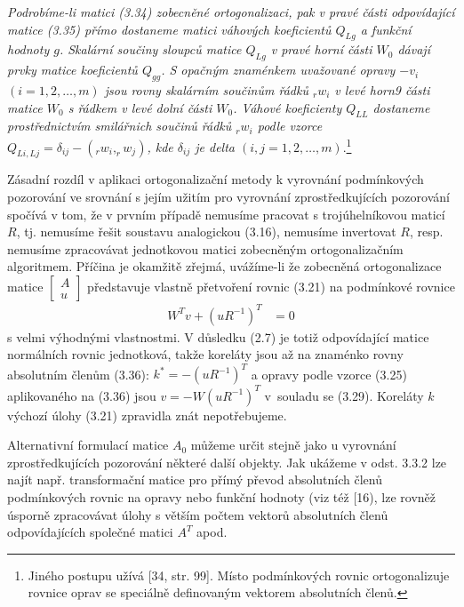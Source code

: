 \emph{Podrobíme-li matici (3.34) zobecněné ortogonalizaci, pak v pravé
části odpovídající matice (3.35) přímo dostaneme matici váhových
koeficientů $Q_{Lg}$ a funkční hodnoty $g$. Skalární součiny sloupců
matice $Q_{Lg}$ v pravé horní části $W_0$ dávají prvky matice
koeficientů $Q_{gg}$. S opačným znaménkem uvažované opravy $-v_i$
$(i=1,2,\ldots,m)$ jsou rovny skalárním součinům řádků $_rw_i$ v levé
horn9 části matice $W_0$ s řádkem v levé dolní části $W_0$. Váhové
koeficienty $Q_{LL}$ dostaneme prostřednictvím smilářnich součinů
řádků $_rw_i$ podle vzorce
%
$Q_{Li,Lj} = \delta_{ij} - (_rw_i,_rw_j)$, kde $\delta_{ij}$
%
je  delta $(i,j=1,2,\ldots,m)$}.\footnote{%
%
Jiného postupu užívá  [34, str. 99]. Místo podmínkových
rovnic ortogonalizuje rovnice oprav se speciálně
definovaným vektorem absolutních členů.}



Zásadní rozdíl v aplikaci ortogonalizační metody k vyrovnání
podmínkových pozorování ve srovnání s jejím užitím pro
vyrovnání zprostředkujících pozorování spočívá v tom, že v
prvním případě nemusíme pracovat s trojúhelníkovou maticí $R$, tj.
nemusíme řešit soustavu analogickou (3.16), nemusíme
invertovat $R$, resp. nemusíme zpracovávat jednotkovou matici
zobecněným ortogonalizačním algoritmem. Příčina je okamžitě zřejmá,
uvážíme-li že zobecněná ortogonalizace matice
%
$\begin{bmatrix}
  A\\u
\end{bmatrix}$
%
představuje vlastně přetvoření rovnic (3.21) na podmínkové rovnice
%
\begin{align*}
\tag{3.36}   W^Tv + (uR^{-1})^T &= 0
\end{align*}
%
s velmi výhodnými vlastnostmi. V důsledku (2.7) je totiž
odpovídající matice normálních rovnic jednotková, takže koreláty
jsou až na znaménko rovny absolutním členům (3.36):
%
$k^*= -(uR^{-1})^T$
%
a opravy  podle vzorce (3.25) aplikovaného na (3.36) jsou
$v = -W(uR^{-1})^T$ v~souladu se (3.29). Koreláty $k$ výchozí úlohy
(3.21) zpravidla znát nepotřebujeme.


Alternativní formulací matice $A_0$ můžeme určit stejně jako u
vyrovnání zprostředkujících pozorování některé další objekty.
Jak ukážeme v odst. 3.3.2 lze najít např. transformační matice
pro přímý převod absolutních členů podmínkových rovnic na opravy
nebo funkční hodnoty (viz též [16), lze rovněž úsporně
zpracovávat úlohy s větším počtem vektorů absolutních členů
odpovídajících společné matici $A^T$ apod.


